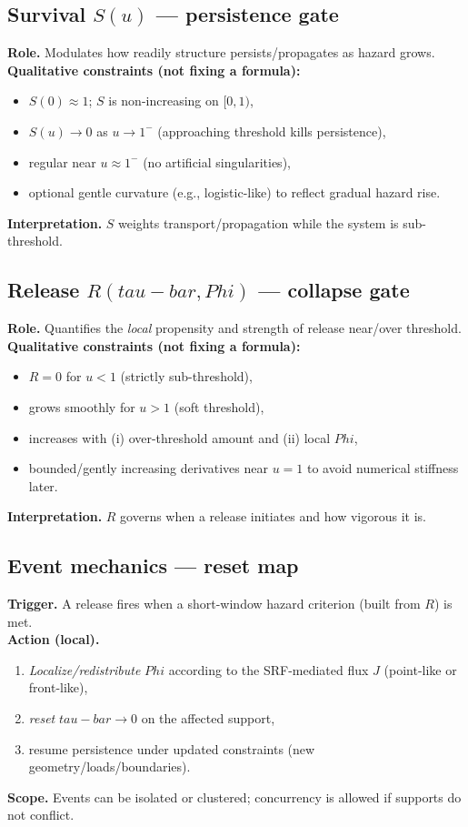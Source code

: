 \documentclass[12pt]{article}
\newcommand{\FoldDensity}{\Phi}
\newcommand{\FoldTime}{\bar{\tau}}
\newcommand{\Survival}{S}
\newcommand{\Release}{R}
\def\FoldDensity{Phi}%
\def\FoldTime{tau-bar}%
\def\Survival{S}%
\def\Release{R}%
\def\bar#1{#1}%
\begin{document}
\subsection[Survival S(u) — persistence gate]{Survival $\Survival(u)$ — persistence gate}
\textbf{Role.} Modulates how readily structure persists/propagates as hazard grows.\\
\textbf{Qualitative constraints (not fixing a formula):}
\begin{itemize}
  \item $\Survival(0)\approx 1$; $\Survival$ is non-increasing on $[0,1)$,
  \item $\Survival(u)\to 0$ as $u\to 1^{-}$ (approaching threshold kills persistence),
  \item regular near $u\approx 1^{-}$ (no artificial singularities),
  \item optional gentle curvature (e.g., logistic-like) to reflect gradual hazard rise.
\end{itemize}
\textbf{Interpretation.} $\Survival$ weights transport/propagation while the system is sub-threshold.

\subsection[Release R(tau-bar, Phi) — collapse gate]{Release $\Release(\FoldTime,\FoldDensity)$ — collapse gate}
\textbf{Role.} Quantifies the \emph{local} propensity and strength of release near/over threshold.\\
\textbf{Qualitative constraints (not fixing a formula):}
\begin{itemize}
  \item $\Release=0$ for $u<1$ (strictly sub-threshold),
  \item grows smoothly for $u>1$ (soft threshold),
  \item increases with (i) over-threshold amount and (ii) local $\FoldDensity$,
  \item bounded/gently increasing derivatives near $u=1$ to avoid numerical stiffness later.
\end{itemize}
\textbf{Interpretation.} $\Release$ governs when a release initiates and how vigorous it is.

\subsection{Event mechanics — reset map}
\textbf{Trigger.} A release fires when a short-window hazard criterion (built from $\Release$) is met.\\
\textbf{Action (local).}
\begin{enumerate}
  \item \emph{Localize/redistribute} $\FoldDensity$ according to the SRF-mediated flux $J$ (point-like or front-like),
  \item \emph{reset} $\FoldTime\to 0$ on the affected support,
  \item resume persistence under updated constraints (new geometry/loads/boundaries).
\end{enumerate}
\textbf{Scope.} Events can be isolated or clustered; concurrency is allowed if supports do not conflict.
\end{document}
